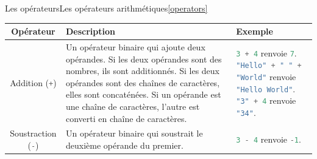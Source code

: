 \documentclass{beamer}
\begin{document}
\begin{frame}{Les opérateurs}{Les opérateurs arithmétiques\cref{operators}}
    \begin{tiny}
        \begin{table}[h!]
            \centering
            \begin{tabular}{|c|p{4cm}|p{4cm}|}
                \hline
                \textbf{Opérateur}                                  & \textbf{Description}                                                                                                                                                                                                                                                                   & \textbf{Exemple}                                                                                                                                                                                                                                                                                              \\
                \hline
                Addition (\lstinline[language=Javascript]!+!)       & Un opérateur binaire qui ajoute deux opérandes. Si les deux opérandes sont des nombres, ils sont additionnés. Si les deux opérandes sont des chaînes de caractères, elles sont concaténées. Si un opérande est une chaîne de caractères, l'autre est converti en chaîne de caractères. & \lstinline[language=Javascript]!3 + 4! renvoie \lstinline[language=Javascript]!7!. \newline \lstinline[language=Javascript]!"Hello" + " " + "World"! renvoie \lstinline[language=Javascript]!"Hello World"!. \newline \lstinline[language=Javascript]!"3" + 4! renvoie \lstinline[language=Javascript]!"34"!. \\
                \hline
                Soustraction (\lstinline[language=Javascript]!-!)   & Un opérateur binaire qui soustrait le deuxième opérande du premier.                                                                                                                                                                                                                    & \lstinline[language=Javascript]!3 - 4! renvoie \lstinline[language=Javascript]!-1!.                                                                                                                                                                                                                           \\
                \hline

\end{tabular}
\end{table}
\end{tiny}
\end{frame}
\end{document}
